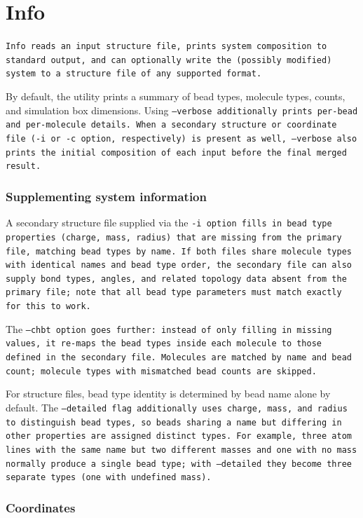 \section{Info} \label{sec:Info}

\tt{Info} reads an input structure file, prints system composition to standard
output, and can optionally write the (possibly modified) system to a structure
file of any supported format.

By default, the utility prints a summary of bead types, molecule types, counts,
and simulation box dimensions. Using \tt{--verbose} additionally prints per-bead
and per-molecule details. When a secondary structure or coordinate file (\tt{-i}
or \tt{-c} option, respectively) is present as well, \tt{--verbose} also prints
the initial composition of each input before the final merged result.

\subsubsection*{Supplementing system information}

A secondary structure file supplied via the \tt{-i} option fills in bead type
properties (charge, mass, radius) that are missing from the primary file,
matching bead types by name. If both files share molecule types with identical
names and bead type order, the secondary file can also supply bond types,
angles, and related topology data absent from the primary file; note that all
bead type parameters must match exactly for this to work.

The \tt{--chbt} option goes further: instead of only filling in missing values,
it re-maps the bead types inside each molecule to those defined in the secondary
file. Molecules are matched by name and bead count; molecule types with
mismatched bead counts are skipped.

For \vtf structure files, bead type identity is determined by bead name alone by
default. The \tt{--detailed} flag additionally uses charge, mass, and radius to
distinguish bead types, so beads sharing a name but differing in other properties
are assigned distinct types. For example, three \tt{atom} lines with the same
name but two different masses and one with no mass normally produce a single
bead type; with \tt{--detailed} they become three separate types (one with
undefined mass).

\subsubsection*{Coordinates}

